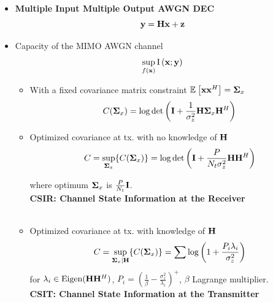 \documentclass[xcolor=dvipsnames,aspectratio=169]{beamer}
\begin{document}
{\begin{itemize}
 \pagebreak
 \item \textbf{Multiple Input Multiple Output AWGN DEC}
    $$\mathbf{y}=\mathbf{H}\mathbf{x}+\mathbf{z}$$
 \item Capacity of the MIMO AWGN channel
    $$\sup_{f(\mathbf{x})}{\textnormal{I}\left(\mathbf{x};\mathbf{y}\right)}$$
    \begin{itemize}
        \item With a fixed covariance matrix constraint ${\mathbb{E}_{}\left[\mathbf{x}\mathbf{x}^H\right]}=\mathbf{\boldsymbol{\Sigma}}_x$
            $$C(\mathbf{\boldsymbol{\Sigma}}_x)=\log\det\left(\mathbf{I}+\frac{1}{\sigma_z^2}\mathbf{H}\mathbf{\boldsymbol{\Sigma}}_x\mathbf{H}^H\right)$$
            \pagebreak
        \item Optimized covariance at tx. with no knowledge of $\mathbf{H}$
            \begin{equation}
            \label{eq:Ccsir}
                C=\sup_{\mathbf{\boldsymbol{\Sigma}}_x}\{C(\mathbf{\boldsymbol{\Sigma}}_x)\}=\log\det\left(\mathbf{I}+\frac{P}{N_t\sigma_z^2}\mathbf{H}\mathbf{H}^H\right)
            \end{equation}

            where optimum $\mathbf{\boldsymbol{\Sigma}}_x$ is $\frac{P}{N_t}\mathbf{I}$.\\
            \textbf{CSIR: Channel State Information at the Receiver}\\ \ \\
        \item Optimized covariance at tx. with knowledge of $\mathbf{H}$
            \begin{equation}
            \label{eq:Ccsit}
                C=\sup_{\mathbf{\boldsymbol{\Sigma}}_x|\mathbf{H}}\{C(\mathbf{\boldsymbol{\Sigma}}_x)\}=\sum\log\left(1+\frac{P_i\lambda_i}{\sigma_z^2}\right)
            \end{equation}
            for $\lambda_i\in\textnormal{Eigen}(\mathbf{H}\mathbf{H}^H)$, $P_i=(\frac{1}{\beta}-\frac{\sigma_z^2}{\lambda_i})^+$, $\beta$ Lagrange multiplier.\\
            \textbf{CSIT: Channel State Information at the Transmitter}
    \end{itemize}
\end{itemize}
}
\end{document}
